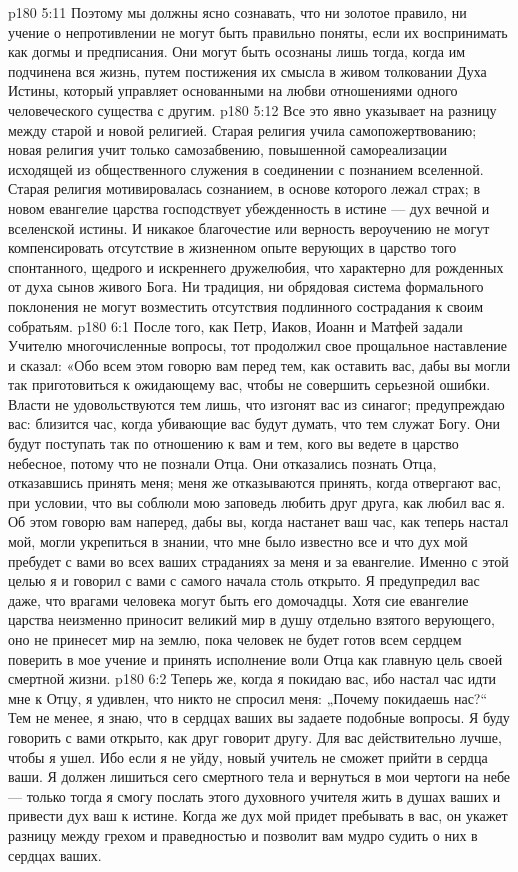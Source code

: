 \vs p180 5:11 Поэтому мы должны ясно сознавать, что ни золотое правило, ни учение о непротивлении не могут быть правильно поняты, если их воспринимать как догмы и предписания. Они могут быть осознаны лишь тогда, когда им подчинена вся жизнь, путем постижения их смысла в живом толковании Духа Истины, который управляет основанными на любви отношениями одного человеческого существа с другим.
\vs p180 5:12 Все это явно указывает на разницу между старой и новой религией. Старая религия учила самопожертвованию; новая религия учит только самозабвению, повышенной самореализации исходящей из общественного служения в соединении с познанием вселенной. Старая религия мотивировалась сознанием, в основе которого лежал страх; в новом евангелие царства господствует убежденность в истине --- дух вечной и вселенской истины. И никакое благочестие или верность вероучению не могут компенсировать отсутствие в жизненном опыте верующих в царство того спонтанного, щедрого и искреннего дружелюбия, что характерно для рожденных от духа сынов живого Бога. Ни традиция, ни обрядовая система формального поклонения не могут возместить отсутствия подлинного сострадания к своим собратьям.
\vs p180 6:1 После того, как Петр, Иаков, Иоанн и Матфей задали Учителю многочисленные вопросы, тот продолжил свое прощальное наставление и сказал: «Обо всем этом говорю вам перед тем, как оставить вас, дабы вы могли так приготовиться к ожидающему вас, чтобы не совершить серьезной ошибки. Власти не удовольствуются тем лишь, что изгонят вас из синагог; предупреждаю вас: близится час, когда убивающие вас будут думать, что тем служат Богу. Они будут поступать так по отношению к вам и тем, кого вы ведете в царство небесное, потому что не познали Отца. Они отказались познать Отца, отказавшись принять меня; меня же отказываются принять, когда отвергают вас, при условии, что вы соблюли мою заповедь любить друг друга, как любил вас я. Об этом говорю вам наперед, дабы вы, когда настанет ваш час, как теперь настал мой, могли укрепиться в знании, что мне было известно все и что дух мой пребудет с вами во всех ваших страданиях за меня и за евангелие. Именно с этой целью я и говорил с вами с самого начала столь открыто. Я предупредил вас даже, что врагами человека могут быть его домочадцы. Хотя сие евангелие царства неизменно приносит великий мир в душу отдельно взятого верующего, оно не принесет мир на землю, пока человек не будет готов всем сердцем поверить в мое учение и принять исполнение воли Отца как главную цель своей смертной жизни.
\vs p180 6:2 Теперь же, когда я покидаю вас, ибо настал час идти мне к Отцу, я удивлен, что никто не спросил меня: „Почему покидаешь нас?“ Тем не менее, я знаю, что в сердцах ваших вы задаете подобные вопросы. Я буду говорить с вами открыто, как друг говорит другу. Для вас действительно лучше, чтобы я ушел. Ибо если я не уйду, новый учитель не сможет прийти в сердца ваши. Я должен лишиться сего смертного тела и вернуться в мои чертоги на небе --- только тогда я смогу послать этого духовного учителя жить в душах ваших и привести дух ваш к истине. Когда же дух мой придет пребывать в вас, он укажет разницу между грехом и праведностью и позволит вам мудро судить о них в сердцах ваших.
